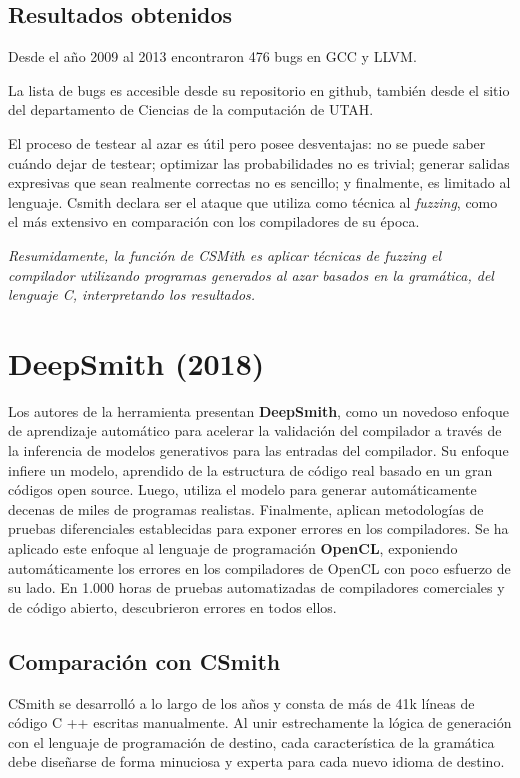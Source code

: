 \subsection{Resultados obtenidos}
Desde el año 2009 al 2013 encontraron 476 bugs en GCC\cite{gccbuglistcsmith} y LLVM\cite{llvmbuglistcsmith}.

La lista de bugs es accesible desde su repositorio\cite{bugsreportedcsmith} en github, también desde el sitio del departamento de Ciencias de la computación de UTAH. 

El proceso de testear al azar es útil pero posee desventajas: no se puede saber cuándo dejar de testear; optimizar las probabilidades no es trivial; generar salidas expresivas que sean realmente correctas no es sencillo; y finalmente, es limitado al lenguaje. Csmith declara ser el ataque que utiliza como técnica al \textit{fuzzing}, como el más extensivo en comparación con los compiladores de su época.

\textit{Resumidamente, la función de CSMith es aplicar técnicas de fuzzing el compilador utilizando programas generados al azar basados en la gramática, del lenguaje C, interpretando los resultados.}

\section{DeepSmith (2018)}
Los autores de la herramienta presentan \textbf{DeepSmith}\cite{Cummins:2018:CFT:3213846.3213848}, como un novedoso enfoque de aprendizaje automático para acelerar la validación del compilador a través de la inferencia de modelos generativos para las entradas del compilador. Su enfoque infiere un modelo, aprendido de la estructura de código real basado en un gran códigos open source. Luego, utiliza el modelo para generar automáticamente decenas de miles de programas realistas. Finalmente, aplican metodologías de pruebas diferenciales establecidas para exponer errores en los compiladores.
Se ha aplicado este enfoque al lenguaje de programación \textbf{OpenCL}, exponiendo automáticamente los errores en los compiladores de OpenCL con poco esfuerzo de su lado. En 1.000 horas de pruebas automatizadas de compiladores comerciales y de código abierto, descubrieron errores en todos ellos.

\subsection{Comparación con CSmith}
CSmith se desarrolló a lo largo de los años y consta de más de 41k líneas de código C ++ escritas manualmente. Al unir estrechamente la lógica de generación con el lenguaje de programación de destino, cada característica de la gramática debe diseñarse de forma minuciosa y experta para cada nuevo idioma de destino.

